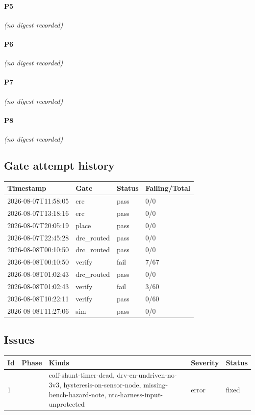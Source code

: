 \documentclass[11pt,a4paper]{article}
\begin{document}
\paragraph*{P5}
\emph{(no digest recorded)}
\paragraph*{P6}
\emph{(no digest recorded)}
\paragraph*{P7}
\emph{(no digest recorded)}
\paragraph*{P8}
\emph{(no digest recorded)}
\subsection*{Gate attempt history}
{\small
\begin{longtable}{llll}
\toprule
\textbf{Timestamp} & \textbf{Gate} & \textbf{Status} & \textbf{Failing/Total} \\
\midrule
\endhead
2026-08-07T11:58:05 & erc & pass & 0/0 \\
2026-08-07T13:18:16 & erc & pass & 0/0 \\
2026-08-07T20:05:19 & place & pass & 0/0 \\
2026-08-07T22:45:28 & drc\_routed & pass & 0/0 \\
2026-08-08T00:10:50 & drc\_routed & pass & 0/0 \\
2026-08-08T00:10:50 & verify & fail & 7/67 \\
2026-08-08T01:02:43 & drc\_routed & pass & 0/0 \\
2026-08-08T01:02:43 & verify & fail & 3/60 \\
2026-08-08T10:22:11 & verify & pass & 0/60 \\
2026-08-08T11:27:06 & sim & pass & 0/0 \\
\bottomrule
\end{longtable}
}
\subsection*{Issues}
{\small
\begin{longtable}{llp{5cm}ll}
\toprule
\textbf{Id} & \textbf{Phase} & \textbf{Kinds} & \textbf{Severity} & \textbf{Status} \\
\midrule
\endhead
1 &  & coff-shunt-timer-dead, drv-en-undriven-no-3v3, hysteresis-on-sensor-node, missing-bench-hazard-note, ntc-harness-input-unprotected & error & fixed \\
\bottomrule
\end{longtable}
}
\end{document}
